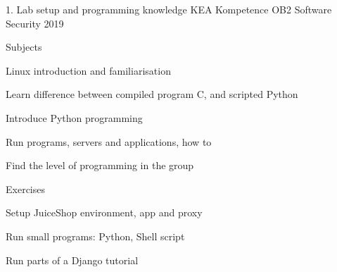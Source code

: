 \documentclass[Screen16to9,17pt]{foils}
\begin{document}
\mytitlepage
{1. Lab setup and programming knowledge}
{KEA Kompetence OB2 Software Security 2019}


\begin{list1}
\item Subjects
\begin{list2}
\item Linux introduction and familiarisation
\item Learn difference between compiled program C, and scripted Python
\item Introduce Python programming
\item Run programs, servers and applications, how to
\item Find the level of programming in the group
\end{list2}
\item Exercises
\begin{list2}
\item Setup JuiceShop environment, app and proxy
\item Run small programs: Python, Shell script
\item Run parts of a Django tutorial
\end{list2}
\end{list1}


\begin{list1}
\item
\item
\end{list1}



\begin{list1}
\item
\end{list1}






\end{document}

